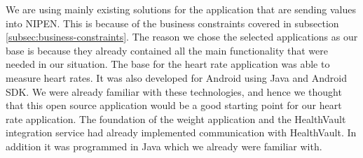We are using mainly existing solutions for the application that are sending values into NIPEN.
This is because of the business constraints covered in subsection \ref{subsec:business-constraints}.
The reason we chose the selected applications as our base is because they already contained all the main functionality that were needed in our situation.
The base for the heart rate application was able to measure heart rates.
It was also developed for Android using Java and Android SDK.
We were already familiar with these technologies, and hence we thought that this open source application would be a good starting point for our heart rate application.
The foundation of the weight application and the HealthVault integration service had already implemented communication with HealthVault.
In addition it was programmed in Java which we already were familiar with.